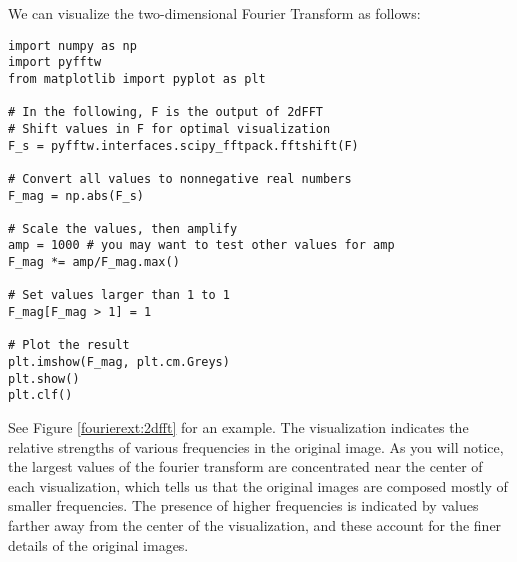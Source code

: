 We can visualize the two-dimensional Fourier Transform as follows:
\begin{lstlisting}
import numpy as np
import pyfftw
from matplotlib import pyplot as plt

# In the following, F is the output of 2dFFT
# Shift values in F for optimal visualization
F_s = pyfftw.interfaces.scipy_fftpack.fftshift(F)

# Convert all values to nonnegative real numbers
F_mag = np.abs(F_s)

# Scale the values, then amplify
amp = 1000 # you may want to test other values for amp
F_mag *= amp/F_mag.max()

# Set values larger than 1 to 1
F_mag[F_mag > 1] = 1

# Plot the result
plt.imshow(F_mag, plt.cm.Greys)
plt.show()
plt.clf()
\end{lstlisting}
See Figure \ref{fourierext:2dfft} for an example. The visualization indicates
the relative strengths of various frequencies in the original image.
As you will notice, the largest values of the fourier transform are concentrated
near the center of each visualization, which tells us that the original images are
composed mostly of smaller frequencies. The presence of higher frequencies is indicated
by values farther away from the center of the visualization, and these account for the
finer details of the original images.

